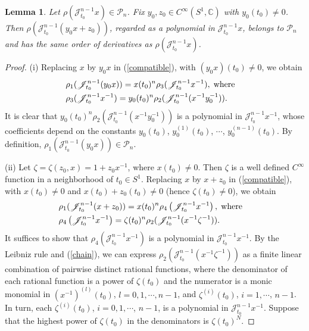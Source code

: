 \documentclass[11pt]{amsart}
\numberwithin{equation}{section}
\newcommand{\di}{\displaystyle}
\newtheorem{lemma}[thm]{Lemma}
\newcommand{\sjm}{\mathscr{J}^{n-1}_{t_0}}
\newcommand{\sjmx}{\mathscr{J}^{n-1}_{t_0} x}
\newcommand{\cisoc}{C^{\infty}\left(S^1, \mathbb{C} \right)}
\newcommand{\pn}{\mathscr{P}_{n}}
\begin{document}
\begin{lemma} \label{invariantr}
Let $\di\rho(\sjmx)\in\pn$. Fix $\di y_0,z_0\in\cisoc$ with $y_0(t_0)\neq0$. Then $\rho(\sjm(y_0x+z_0))$, regarded as a polynomial in $\sjmx$, belongs to $\pn$ and has the same order of derivatives as $\rho(\sjmx)$.
\end{lemma}
\begin{proof}
  (i) Replacing $x$ by $y_0x$ in (\ref{compatible}), with $(y_0x)(t_0) \not=0$, we obtain
  \begin{eqnarray*}
  & \rho_1( \sjm(y_0x))=x(t_0)^n \rho_3(\sjm x^{-1}), \hspace{1mm} \text{where} & \\
  & \rho_3(\sjm x^{-1})= y_0(t_0)^n \rho_2( \sjm (x^{-1} y_0^{-1})). &
  \end{eqnarray*}
  It is clear that
  $y_0(t_0)^n \rho_2( \sjm (x^{-1} y_0^{-1}))$ is a polynomial in $\sjm x^{-1}$,
  whose coefficients depend on the constants $y_0(t_0)$, $y^{(1)}_0(t_0)$, $\cdots$, $y_0^{(n-1)}(t_0)$. By definition,
  $\rho_1(\sjm(y_0x)) \in \pn$.

  (ii) Let $\zeta=\zeta(z_0, x)=1+z_0x^{-1}$, where $x(t_0) \not=0$. Then $\zeta$ is a well defined
  $C^{\infty}$ function in a neighborhood of $t_0 \in S^1$.
  Replacing $x$ by $x+z_0$ in (\ref{compatible}),
  with $x(t_0) \not=0$ and $x(t_0)+z_0(t_0) \not=0$ (hence
 $\zeta(t_0) \not=0$),
we obtain
  \begin{eqnarray} \label{ga}
 & \rho_1(\sjm(x+z_0))=x(t_0)^n  \rho_4\left( \sjm x^{-1} \right), \hspace{1mm} \text{where} & \\
 & \rho_4\left( \sjm x^{-1} \right)= \zeta(t_0)^n \rho_2(\sjm(x^{-1} \zeta^{-1})). & \notag
  \end{eqnarray}
 It suffices to show that $ \rho_4\left( \sjm x^{-1} \right)$ is a polynomial in $\sjm x^{-1}$.
  By the Leibniz rule
  and (\ref{chain}), we can express
  $\rho_2(\sjm(x^{-1} \zeta^{-1}))$ as
  a finite linear combination of pairwise distinct rational functions,
  where the denominator of each rational function is a power of $\zeta(t_0)$ and the numerator
  is a monic monomial in $(x^{-1})^{(l)}(t_0)$, $l=0, 1, \cdots, n-1$, and
  $\zeta^{(i)}(t_0)$, $i=1, \cdots$, $n-1$.
  In turn, each $\zeta^{(i)}(t_0)$, $i=0, 1, \cdots$, $n-1$, is a polynomial in $\sjm x^{-1}$.
  Suppose that the highest power of $\zeta(t_0)$ in the denominators is $\zeta(t_0)^{N}$.


\end{proof}
\end{document}
